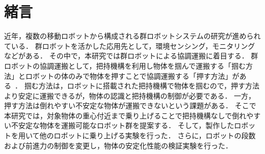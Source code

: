 \section{緒言}
近年，複数の移動ロボットから構成される群ロボットシステムの研究が進められている．
群ロボットを活かした応用先として，環境センシング，モニタリングなどがある．
その中で，本研究では群ロボットによる協調運搬に着目する．
群ロボットの協調運搬として，把持機構を利用し物体を掴んで運搬する「掴む方法」とロボットの体のみで物体を押すことで協調運搬する「押す方法」がある~\cite{swarmBot,push-only2}．
掴む方法は，ロボットに搭載された把持機構で物体を掴むので，押す方法より安定に運搬できるが，物体の認識と把持機構の制御が必要である．
一方，押す方法は倒れやすい不安定な物体が運搬できないという課題がある．
そこで本研究では，対象物体の重心付近まで乗り上げることで把持機構なしで倒れやすい不安定な物体を運搬可能なロボット群を提案する．
そして，製作したロボットを用いて他のロボットに乗り上げる実験を行った．
さらに，ロボットの段数および前進力の制御を変更し，物体の安定化性能の検証実験を行った．
